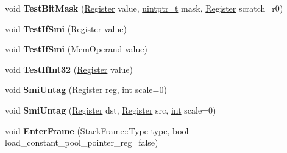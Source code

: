 \begin{DoxyCompactItemize}
void {\bfseries Test\+Bit\+Mask} (\mbox{\hyperlink{classv8_1_1internal_1_1Register}{Register}} value, \mbox{\hyperlink{classuintptr__t}{uintptr\+\_\+t}} mask, \mbox{\hyperlink{classv8_1_1internal_1_1Register}{Register}} scratch=r0)
\item 
\mbox{\label{classv8_1_1internal_1_1TurboAssembler_ac328329ba7e33a1393003f65ceb8c7bf}} 
void {\bfseries Test\+If\+Smi} (\mbox{\hyperlink{classv8_1_1internal_1_1Register}{Register}} value)
\item 
\mbox{\label{classv8_1_1internal_1_1TurboAssembler_affd6694bfb69f28a8acb6e6c46d18a96}} 
void {\bfseries Test\+If\+Smi} (\mbox{\hyperlink{classv8_1_1internal_1_1MemOperand}{Mem\+Operand}} value)
\item 
\mbox{\label{classv8_1_1internal_1_1TurboAssembler_af72d7aac31d2b7cdd8b8fcfd753bdce5}} 
void {\bfseries Test\+If\+Int32} (\mbox{\hyperlink{classv8_1_1internal_1_1Register}{Register}} value)
\item 
\mbox{\label{classv8_1_1internal_1_1TurboAssembler_a67c486854995dd8099ed237dd30e4c54}} 
void {\bfseries Smi\+Untag} (\mbox{\hyperlink{classv8_1_1internal_1_1Register}{Register}} reg, \mbox{\hyperlink{classint}{int}} scale=0)
\item 
\mbox{\label{classv8_1_1internal_1_1TurboAssembler_a0104135ffafe809cb3fa52e1924f0725}} 
void {\bfseries Smi\+Untag} (\mbox{\hyperlink{classv8_1_1internal_1_1Register}{Register}} dst, \mbox{\hyperlink{classv8_1_1internal_1_1Register}{Register}} src, \mbox{\hyperlink{classint}{int}} scale=0)
\item 
\mbox{\label{classv8_1_1internal_1_1TurboAssembler_a57fdf7de333af641574c0bd4c4b7f8d4}} 
void {\bfseries Enter\+Frame} (Stack\+Frame\+::\+Type \mbox{\hyperlink{classstd_1_1conditional_1_1type}{type}}, \mbox{\hyperlink{classbool}{bool}} load\+\_\+constant\+\_\+pool\+\_\+pointer\+\_\+reg=false)
\item 
\mbox{\label{classv8_1_1internal_1_1TurboAssembler_a6eb2343cdde571931cf6e8f4c7033bd0}} 

\end{DoxyCompactItemize}
